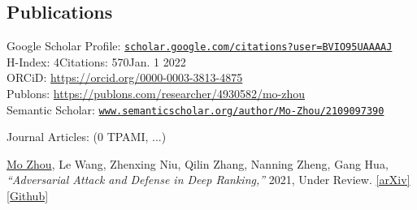 \documentclass[10pt,margin,line,pifont,palatino,courier]{res}
\begin{document}
\begin{resume}

%


\section{\sc Publications}
	Google Scholar Profile:
	\href{https://scholar.google.com/citations?user=BVIO95UAAAAJ}{\small\texttt{scholar.google.com/citations?user=BVIO95UAAAAJ}}\\
	\hspace*{9.7em}H-Index: 4\qquad Citations: 570\qquad Jan. 1 2022\\
	\hspace*{6.1em}ORCiD: {\small\url{https://orcid.org/0000-0003-3813-4875}}\\
	\hspace*{5.9em}Publons: {\small\url{https://publons.com/researcher/4930582/mo-zhou}}\\
	\hspace*{2.1em}Semantic Scholar: \href{https://www.semanticscholar.org/author/Mo-Zhou/2109097390}{\small\texttt{www.semanticscholar.org/author/Mo-Zhou/2109097390}}

	{\sc Journal Articles:} \hfill(0 TPAMI, ...)\\

\begin{enumerate}[noitemsep, leftmargin=*, label={[J0{\arabic*}]}]

\item \underline{Mo Zhou}, Le Wang, Zhenxing Niu, Qilin Zhang, Nanning Zheng, Gang Hua,
\textit{``Adversarial Attack and Defense in Deep Ranking,''}
2021, Under Review.
\href{https://arxiv.org/abs/2106.03614}{[arXiv]}
\href{https://cdluminate.github.io/robrank/}{[Github]}

\begin{comment}
\item Le Wang, \underline{Mo Zhou}, Zhenxing Niu, Qilin Zhang, Nanning Zheng,
\textit{``Adaptive Ladder Loss for Learning Coherent Visual-Semantic Embedding,''}
IEEE Transactions on Multimedia (TMM), 2021.
DOI: 10.1109/TMM.2021.3139210.
\href{https://ieeexplore.ieee.org/document/9665378}{[IEEE Xplore]}
\end{comment}


\end{enumerate}
\end{resume}
\end{document}
